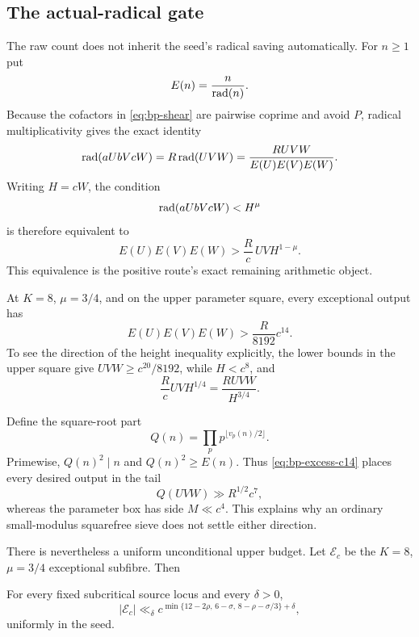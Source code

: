 \subsection{The actual-radical gate}

The raw count does not inherit the seed's radical saving automatically.  For
$n\geq1$ put
\[
                         E(n)=\frac{n}{\operatorname{rad}(n)}.
\]
Because the cofactors in \eqref{eq:bp-shear} are pairwise coprime and avoid
$P$, radical multiplicativity gives the exact identity
\begin{equation}\label{eq:bp-excess-identity}
 \operatorname{rad}(aUbVcW)=R\operatorname{rad}(UVW)
             =\frac{RUVW}{E(U)E(V)E(W)}.
\end{equation}
Writing $H=cW$, the condition
\[
                       \operatorname{rad}(aUbVcW)<H^\mu
\]
is therefore equivalent to
\begin{equation}\label{eq:bp-excess-gate}
 E(U)E(V)E(W)>\frac{R}{c}\,UVH^{1-\mu}.
\end{equation}
This equivalence is the positive route's exact remaining arithmetic object.

At $K=8$, $\mu=3/4$, and on the upper parameter square, every exceptional
output has
\begin{equation}\label{eq:bp-excess-c14}
                       E(U)E(V)E(W)>\frac{R}{8192}c^{14}.
\end{equation}
To see the direction of the height inequality explicitly, the lower bounds
in the upper square give $UVW\geq c^{20}/8192$, while $H<c^8$, and
\[
 \frac{R}{c}UVH^{1/4}=\frac{RUVW}{H^{3/4}}.
\]

Define the square-root part
\[
 Q(n)=\prod_p p^{\lfloor v_p(n)/2\rfloor}.
\]
Primewise, $Q(n)^2\mid n$ and $Q(n)^2\geq E(n)$.  Thus
\eqref{eq:bp-excess-c14} places every desired output in the tail
\begin{equation}\label{eq:bp-large-square-tail}
                        Q(UVW)\gg R^{1/2}c^7,
\end{equation}
whereas the parameter box has side $M\ll c^4$.  This explains why an
ordinary small-modulus squarefree sieve does not settle either direction.

There is nevertheless a uniform unconditional upper budget.  Let
$\mathcal E_c$ be the $K=8$, $\mu=3/4$ exceptional subfibre.  Then
\begin{theorem}
\label{thm:bp-three-way-budget}
For every fixed subcritical source locus and every $\delta>0$,
\begin{equation}\label{eq:bp-three-way-budget}
 |\mathcal E_c|\ll_\delta
 c^{\min\{12-2\rho,\,6-\sigma,\,8-\rho-\sigma/3\}+\delta},
\end{equation}
uniformly in the seed.
\end{theorem}

